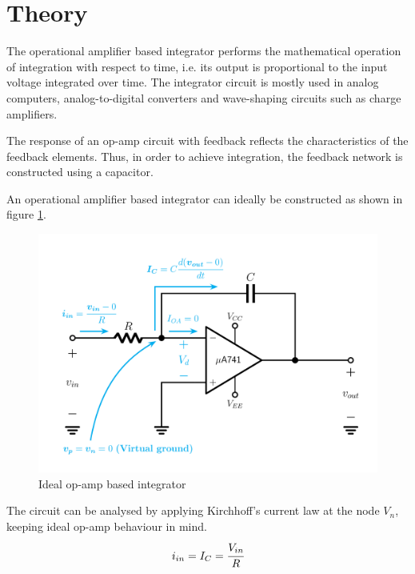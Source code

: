 \documentclass[12pt, titlepage]{article}
\theoremstyle{definition}
\begin{document}
  \newpage
  \section{Theory}
    The operational amplifier based integrator performs the mathematical operation of integration with respect to time, i.e. its output is proportional to the input voltage integrated over time.
    The integrator circuit is mostly used in analog computers, analog-to-digital converters and wave-shaping circuits such as charge amplifiers.

    The response of an op-amp circuit with feedback reflects the characteristics of the feedback elements. Thus, in order to achieve integration, the feedback network is constructed using a capacitor.

    An operational amplifier based integrator can ideally be constructed as shown in figure \ref{fig:theoretical_ideal_integrator}.

    \begin{figure}[h]
      \centering
      \includegraphics[scale=0.25]{images/ideal_integrator.png}
      \caption{Ideal op-amp based integrator}
      \label{fig:theoretical_ideal_integrator}
    \end{figure}

    The circuit can be analysed by applying Kirchhoff's current law at the node $V_n$, keeping ideal op-amp behaviour in mind.
    \begin{equation}\label{eq:ideal_kcl_vn}
      i_{in} = I_C = \cfrac{V_{in}}{R}
    \end{equation}
\end{document}
